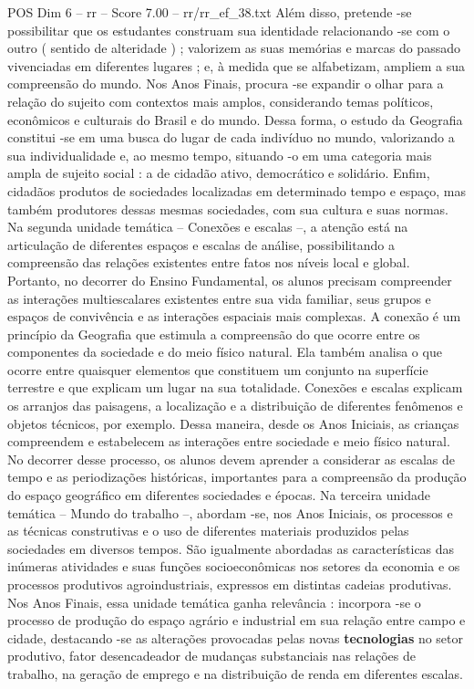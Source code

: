 \begin{textsample}{POS Dim 6 – rr – Score 7.00 – rr/rr\_ef\_38.txt}
Além disso, pretende -se possibilitar que os estudantes construam sua identidade relacionando -se com o outro ( sentido de alteridade ) ; valorizem as suas memórias e marcas do passado vivenciadas em diferentes lugares ; e, à medida que se alfabetizam, ampliem a sua compreensão do mundo.
Nos Anos Finais, procura -se expandir o olhar para a relação do sujeito com contextos mais amplos, considerando temas políticos, econômicos e culturais do Brasil e do mundo.
Dessa forma, o estudo da Geografia constitui -se em uma busca do lugar de cada indivíduo no mundo, valorizando a sua individualidade e, ao mesmo tempo, situando -o em uma categoria mais ampla de sujeito social : a de cidadão ativo, democrático e solidário.
Enfim, cidadãos produtos de sociedades localizadas em determinado tempo e espaço, mas também produtores dessas mesmas sociedades, com sua cultura e suas normas.
Na segunda unidade temática – Conexões e escalas –, a atenção está na articulação de diferentes espaços e escalas de análise, possibilitando a compreensão das relações existentes entre fatos nos níveis local e global.
Portanto, no decorrer do Ensino Fundamental, os alunos precisam compreender as interações multiescalares existentes entre sua vida familiar, seus grupos e espaços de convivência e as interações espaciais mais complexas.
A conexão é um princípio da Geografia que estimula a compreensão do que ocorre entre os componentes da sociedade e do meio físico natural.
Ela também analisa o que ocorre entre quaisquer elementos que constituem um conjunto na superfície terrestre e que explicam um lugar na sua totalidade.
Conexões e escalas explicam os arranjos das paisagens, a localização e a distribuição de diferentes fenômenos e objetos técnicos, por exemplo.
Dessa maneira, desde os Anos Iniciais, as crianças compreendem e estabelecem as interações entre sociedade e meio físico natural.
No decorrer desse processo, os alunos devem aprender a considerar as escalas de tempo e as periodizações históricas, importantes para a compreensão da produção do espaço geográfico em diferentes sociedades e épocas.
Na terceira unidade temática – Mundo do trabalho –, abordam -se, nos Anos Iniciais, os processos e as técnicas construtivas e o uso de diferentes materiais produzidos pelas sociedades em diversos tempos.
São igualmente abordadas as características das inúmeras atividades e suas funções socioeconômicas nos setores da economia e os processos produtivos agroindustriais, expressos em distintas cadeias produtivas.
Nos Anos Finais, essa unidade temática ganha relevância : incorpora -se o processo de produção do espaço agrário e industrial em sua relação entre campo e cidade, destacando -se as alterações provocadas pelas novas \textbf{tecnologias} no setor produtivo, fator desencadeador de mudanças substanciais nas relações de trabalho, na geração de emprego e na distribuição de renda em diferentes escalas.

\end{textsample}
